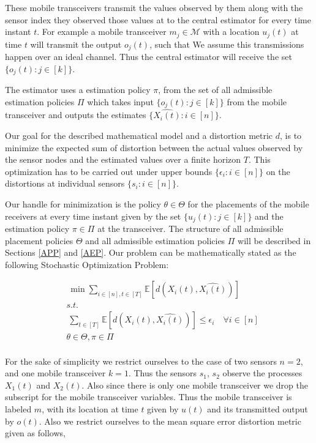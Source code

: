 \documentclass[a4paper,english,12pt]{article}
\begin{document}
These mobile transceivers transmit the values observed by them along with the sensor index they observed those values at to the central estimator for every time instant $t$. For example a mobile transceiver $m_j \in \mathcal{M}$ with a location $u_j(t)$ at time $t$ will transmit the output $o_j(t)$,  such that  %
 We assume this transmissions happen over an ideal channel. Thus the central estimator will receive the set $\{o_j(t): j \in [k]   \}$.

The estimator uses a  estimation policy $\pi$, from the set of all admissible estimation policies $\Pi$ %
which takes input $\{o_j(t): j \in [k]   \}$ from the mobile transceiver and outputs the estimates $\{\hat{X_i(t)}: i \in [n] \}$.


Our goal for the described mathematical model and a distortion metric $d$,   is to minimize the expected sum of distortion between the actual values observed by the sensor nodes  and the estimated values over a finite horizon $T$. This optimization has to be carried out under upper bounds $\{\epsilon_i: i \in [n]\}$ on the distortions at individual sensors $\{s_i:i \in [n]\}$.

 Our handle for minimization is the policy $\theta\in\Theta $ for the placements of the mobile receivers at every time instant given by the set $\{u_j(t): j \in [k]\}$ and the estimation policy $\pi \in \Pi$ at the transceiver. The structure of all admissible placement policies $\Theta$ and all admissible estimation policies $\Pi$ will be described in  Sections \ref{APP} and \ref{AEP}.  
 Our problem can be mathematically stated as the following Stochastic Optimization Problem:

\begin{align}
& \ \min \sum_{i \in [n], t \in [T]} \mathbb{E}[ d(X_i(t),\hat{X_i(t)})]\\
& s.t. \nonumber\\
 &\ \sum_{t \in [T]} \mathbb{E}[d(X_i(t),\hat{X_i(t)})] \leq \epsilon_i \quad \forall i \in [n] \nonumber\\
& \theta \in \Theta , \pi \in \Pi\nonumber\\
\nonumber
\end{align}

For the sake of simplicity we restrict ourselves to the case of two sensors $n=2$, and one mobile transceiver $k=1$. Thus the sensors $s_1$, $s_2$ observe the processes $X_1(t)$ and $X_2(t)$. Also since there is only one mobile transceiver we drop the subscript for the mobile transceiver variables. Thus the mobile transceiver is labeled $m$, with its location at time $t$ given by $u(t)$ and its transmitted output by $o(t)$. Also we restrict ourselves to the   mean square error  distortion metric given as follows,
\end{document}
